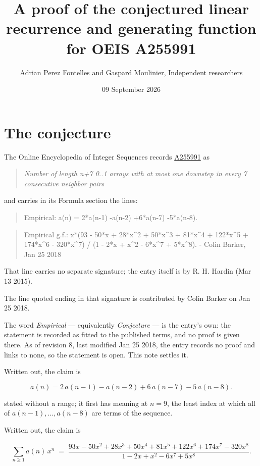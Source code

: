 \documentclass[11pt]{article}
\title{A proof of the conjectured linear recurrence and generating function for OEIS A255991}
\author{Adrian Perez Fontelles and Gaspard Moulinier, Independent researchers}
\date{09 September 2026}
\theoremstyle{definition}
\begin{document}
\maketitle
\section{The conjecture}

The Online Encyclopedia of Integer Sequences records \href{https://oeis.org/A255991}{A255991} as

\begin{quote}\itshape Number of length n+7 0..1 arrays with at most one downstep in every 7 consecutive neighbor pairs\end{quote}

and carries in its Formula section the lines:

\begin{quote}\ttfamily Empirical: a(n) = 2*a(n-1) -a(n-2) +6*a(n-7) -5*a(n-8).\end{quote}

\begin{quote}\ttfamily Empirical g.f.: x*(93 - 50*x + 28*x\textasciicircum{}2 + 50*x\textasciicircum{}3 + 81*x\textasciicircum{}4 + 122*x\textasciicircum{}5 + 174*x\textasciicircum{}6 - 320*x\textasciicircum{}7) / (1 - 2*x + x\textasciicircum{}2 - 6*x\textasciicircum{}7 + 5*x\textasciicircum{}8). - Colin Barker, Jan 25 2018\end{quote}

That line carries no separate signature; the entry itself is by R. H. Hardin (Mar 13 2015).

The line quoted ending in that signature is contributed by Colin Barker on Jan 25 2018.

The word {\itshape Empirical} --- equivalently {\itshape Conjecture} --- is the entry's own: the statement is recorded as fitted to the published terms, and no proof is given there. As of revision 8, last modified Jan 25 2018, the entry records no proof and links to none, so the statement is open. This note settles it.

Written out, the claim is

\[a(n) = 2\,a(n-1) - a(n-2) + 6\,a(n-7) - 5\,a(n-8).\]

stated without a range; it first has meaning at $n = 9$, the least index at which all of $a(n-1),\dots,a(n-8)$ are terms of the sequence.

Written out, the claim is

\[\sum_{n \ge 1} a(n)\,x^n \;=\; \frac{93x - 50x^{2} + 28x^{3} + 50x^{4} + 81x^{5} + 122x^{6} + 174x^{7} - 320x^{8}}{1 - 2x + x^{2} - 6x^{7} + 5x^{8}}.\]
\end{document}
